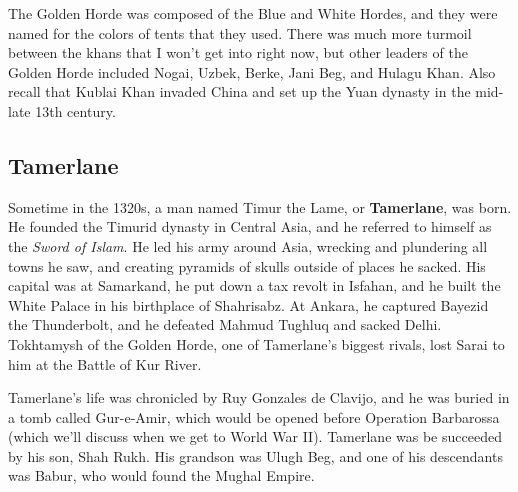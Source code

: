 The Golden Horde was composed of the Blue and White Hordes,
and they were named for the colors of tents that they used.
There was much more turmoil between the khans that I won't get into right now,
but other leaders of the Golden Horde included Nogai, Uzbek, Berke, Jani Beg, and Hulagu Khan.
Also recall that Kublai Khan invaded China and set up the Yuan dynasty in the mid-late 13th century.

\subsection*{Tamerlane}

Sometime in the 1320s, a man named Timur the Lame, or \textbf{Tamerlane}, was born.
He founded the Timurid dynasty in Central Asia, and he referred to himself as the \textit{Sword of Islam}.
He led his army around Asia, wrecking and plundering all towns he saw,
and creating pyramids of skulls outside of places he sacked.
His capital was at Samarkand, he put down a tax revolt in Isfahan,
and he built the White Palace in his birthplace of Shahrisabz.
At Ankara, he captured Bayezid the Thunderbolt,
and he defeated Mahmud Tughluq and sacked Delhi.
Tokhtamysh of the Golden Horde, one of Tamerlane's biggest rivals, lost Sarai to him at the Battle of Kur River.

Tamerlane's life was chronicled by Ruy Gonzales de Clavijo, and he was buried in a tomb called Gur-e-Amir,
which would be opened before Operation Barbarossa (which we'll discuss when we get to World War II).
Tamerlane was be succeeded by his son, Shah Rukh.
His grandson was Ulugh Beg, and one of his descendants was Babur, who would found the Mughal Empire.
